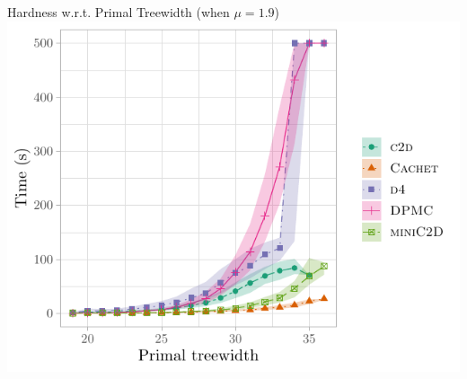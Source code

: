 \documentclass{beamer}
\begin{document}
\begin{frame}{Hardness w.r.t. Primal Treewidth (when $\mu = 1.9$)}
  \includegraphics{treewidth2.pdf}
\end{frame}
\end{document}
